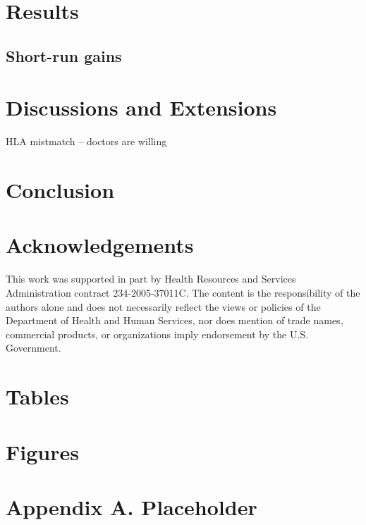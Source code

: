 \documentclass[12pt]{article}
\begin{document}



\section{Results} \label{sec:results}



\subsection{Short-run gains}

\section{Discussions and Extensions} \label{sec:discussion}

HLA mistmatch -- doctors are willing 

\section{Conclusion} \label{sec:conclusion}


\section{Acknowledgements}

This work was supported in part by Health Resources and Services Administration contract 234-2005-37011C. The content is the responsibility of the authors alone and does not necessarily reflect the views or policies of the Department of Health and Human Services, nor does mention of trade names, commercial products, or organizations imply endorsement by the U.S. Government.

\clearpage





\clearpage


\section*{Tables} \label{sec:tab}



\clearpage

\section*{Figures} \label{sec:fig}




\clearpage

\section*{Appendix A. Placeholder} \label{sec:appendixa}
\end{document}
